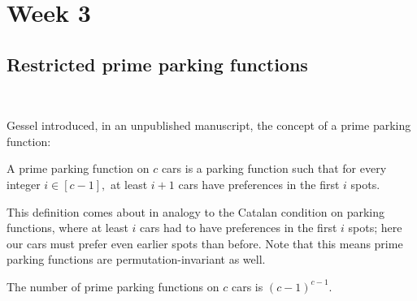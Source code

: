 \section{Week 3}

\subsection*{Restricted prime parking functions}~

Gessel introduced, in an unpublished manuscript, the concept of a prime parking function:

\begin{definition}
    A prime parking function on $c$ cars is a parking function such that for every integer $i\in[c-1],$ at least $i+1$ cars have preferences in the first $i$ spots.
\end{definition}

This definition comes about in analogy to the Catalan condition on parking functions, where at least $i$ cars had to have preferences in the first $i$ spots; here our cars must prefer even earlier spots than before. Note that this means prime parking functions are permutation-invariant as well.

\begin{proposition}
    The number of prime parking functions on $c$ cars is $(c-1)^{c-1}.$
\end{proposition}

